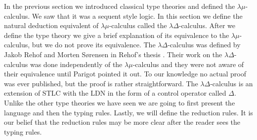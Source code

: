 In the previous section we introduced classical type theories and
defined the $\lambda\mu$-calculus.  We saw that it was a sequent style
logic.  In this section we define the natural deduction equivalent of
$\lambda\mu$-calculus called the $\lambda\Delta$-calculus.  After we
define the type theory we give a brief explanation of its equivalence
to the $\lambda\mu$-calculus, but we do not prove its equivalence.
The $\lambda\Delta$-calculus was defined by Jakob Rehof and Morten
S\o{}rensen in Rehof's thesis \cite{Rehof:1994}.  Their work on the
$\lambda\Delta$-calculus was done independently of the
$\lambda\mu$-calculus and they were not aware of their equivalence
until Parigot pointed it out.  To our knowledge no actual proof was
ever published, but the proof is rather straightforward.  The
$\lambda\Delta$-calculus is an extension of STLC with the LDN in the
form of a control operator called $\Delta$.  Unlike the other type
theories we have seen we are going to first present the language and
then the typing rules.  Lastly, we will define the reduction rules.
It is our belief that the reduction rules may be more clear after the
reader sees the typing rules.

